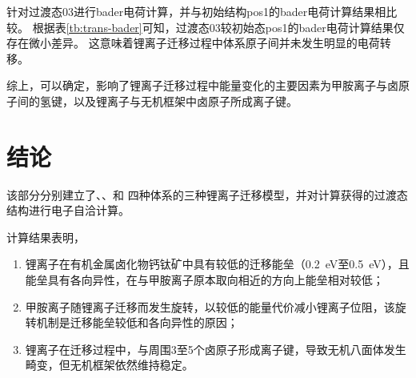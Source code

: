 针对过渡态03进行bader电荷计算，并与初始结构pos1的bader电荷计算结果相比较。
根据表\ref{tb:trans-bader}可知，过渡态03较初始态pos1的bader电荷计算结果仅存在微小差异。
这意味着锂离子迁移过程中体系原子间并未发生明显的电荷转移。

综上，可以确定，影响了锂离子迁移过程中能量变化的主要因素为甲胺离子与卤原子间的氢键，以及锂离子与无机框架中卤原子所成离子键。

\section{结论}

该部分分别建立了、、和 四种体系的三种锂离子迁移模型，并对计算获得的过渡态结构进行电子自洽计算。

计算结果表明，
\begin{enumerate}
    \item 锂离子在有机金属卤化物钙钛矿中具有较低的迁移能垒（\SI{0.2}{eV}至\SI{0.5}{eV}），且能垒具有各向异性，在与甲胺离子原本取向相近的方向上能垒相对较低；
    \item 甲胺离子随锂离子迁移而发生旋转，以较低的能量代价减小锂离子位阻，该旋转机制是迁移能垒较低和各向异性的原因；
    \item 锂离子在迁移过程中，与周围3至5个卤原子形成离子键，导致无机八面体发生畸变，但无机框架依然维持稳定。 
\end{enumerate}

